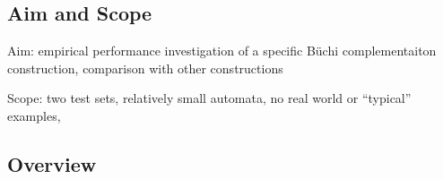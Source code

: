 \subsection{Aim and Scope}

Aim: empirical performance investigation of a specific Büchi complementaiton construction, comparison with other constructions

Scope: two test sets, relatively small automata, no real world or ``typical'' examples,


\subsection{Overview}



